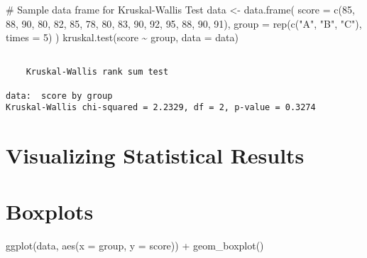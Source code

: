\documentclass[
  letterpaper,
  DIV=11,
  numbers=noendperiod]{scrreprt}
\newenvironment{Shaded}{\begin{snugshade}}{\end{snugshade}}
\newcommand{\AttributeTok}[1]{\textcolor[rgb]{0.40,0.45,0.13}{#1}}
\newcommand{\CommentTok}[1]{\textcolor[rgb]{0.37,0.37,0.37}{#1}}
\newcommand{\DecValTok}[1]{\textcolor[rgb]{0.68,0.00,0.00}{#1}}
\newcommand{\FunctionTok}[1]{\textcolor[rgb]{0.28,0.35,0.67}{#1}}
\newcommand{\NormalTok}[1]{\textcolor[rgb]{0.00,0.23,0.31}{#1}}
\newcommand{\OtherTok}[1]{\textcolor[rgb]{0.00,0.23,0.31}{#1}}
\newcommand{\SpecialCharTok}[1]{\textcolor[rgb]{0.37,0.37,0.37}{#1}}
\newcommand{\StringTok}[1]{\textcolor[rgb]{0.13,0.47,0.30}{#1}}
\begin{document}
\begin{Shaded}
\begin{Highlighting}[]
\CommentTok{\# Sample data frame for Kruskal{-}Wallis Test}
\NormalTok{data }\OtherTok{\textless{}{-}} \FunctionTok{data.frame}\NormalTok{(}
  \AttributeTok{score =} \FunctionTok{c}\NormalTok{(}\DecValTok{85}\NormalTok{, }\DecValTok{88}\NormalTok{, }\DecValTok{90}\NormalTok{, }\DecValTok{80}\NormalTok{, }\DecValTok{82}\NormalTok{, }\DecValTok{85}\NormalTok{, }\DecValTok{78}\NormalTok{, }\DecValTok{80}\NormalTok{, }\DecValTok{83}\NormalTok{, }\DecValTok{90}\NormalTok{, }\DecValTok{92}\NormalTok{, }\DecValTok{95}\NormalTok{, }\DecValTok{88}\NormalTok{, }\DecValTok{90}\NormalTok{, }\DecValTok{91}\NormalTok{),}
  \AttributeTok{group =} \FunctionTok{rep}\NormalTok{(}\FunctionTok{c}\NormalTok{(}\StringTok{"A"}\NormalTok{, }\StringTok{"B"}\NormalTok{, }\StringTok{"C"}\NormalTok{), }\AttributeTok{times =} \DecValTok{5}\NormalTok{)}
\NormalTok{)}
\FunctionTok{kruskal.test}\NormalTok{(score }\SpecialCharTok{\textasciitilde{}}\NormalTok{ group, }\AttributeTok{data =}\NormalTok{ data)}
\end{Highlighting}
\end{Shaded}

\begin{verbatim}

    Kruskal-Wallis rank sum test

data:  score by group
Kruskal-Wallis chi-squared = 2.2329, df = 2, p-value = 0.3274
\end{verbatim}

\section{Visualizing Statistical
Results}\label{visualizing-statistical-results}

\section{Boxplots}\label{boxplots}

\begin{Shaded}
\begin{Highlighting}[]
\FunctionTok{ggplot}\NormalTok{(data, }\FunctionTok{aes}\NormalTok{(}\AttributeTok{x =}\NormalTok{ group, }\AttributeTok{y =}\NormalTok{ score)) }\SpecialCharTok{+}
  \FunctionTok{geom\_boxplot}\NormalTok{()}
\end{Highlighting}
\end{Shaded}
\end{document}
